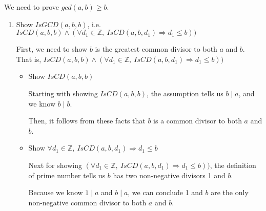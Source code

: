 \documentclass[12pt]{article}
\begin{document}
\begin{enumerate}[a.]
\begin{mdframed}
        \bigskip

        We need to prove $gcd(a,b) \geq b$.

        \bigskip

        \begin{enumerate}[1.]
            \item Show $IsGCD(a,b,b)$, i.e. $ IsCD(a,b,b) \land (\forall d_1 \in \mathbb{Z},\:IsCD(a,b,d_1) \Rightarrow d_1 \leq b))$

            \bigskip

            First, we need to show $b$ is the greatest common divisor to both $a$ and $b$. That is,
            $IsCD(a,b,b) \land (\forall d_1 \in \mathbb{Z},\:IsCD(a,b,d_1) \Rightarrow d_1 \leq b))$

            \bigskip

            \begin{itemize}
                \item Show $IsCD(a,b,b)$

                \bigskip

                \begin{mdframed}
                Starting with showing $IsCD(a,b,b)$, the assumption tells us
                $b \mid a$, and we know $b \mid b$.

                \bigskip

                Then, it follows from these facts that $b$ is a common divisor to
                both $a$ and $b$.

                \end{mdframed}

                \item Show $\forall d_1 \in \mathbb{Z},\:IsCD(a,b,d_1) \Rightarrow d_1 \leq b$

                \bigskip

                \begin{mdframed}

                Next for showing $(\forall d_1 \in \mathbb{Z},\:IsCD(a,b,d_1)
                \Rightarrow d_1 \leq b))$, the definition of prime number
                tells us $b$ has two non-negative divisors 1 and $b$.

                \bigskip

                Because we know $1 \mid a$ and $b \mid a$, we can conclude 1 and
                $b$ are the only non-negative common divisor to both $a$ and $b$.

                \bigskip


\end{mdframed}
\end{itemize}
\end{enumerate}
\end{mdframed}
\end{enumerate}
\end{document}
